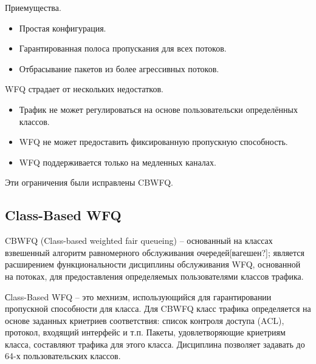 	Приемущества.
	\begin{itemize}
		\item Простая конфигурация.
		\item Гарантированная полоса пропускания для всех потоков.
		\item Отбрасывание пакетов из более агрессивных потоков.
	\end{itemize}

    WFQ страдает от нескольких недостатков.
	\begin{itemize}
    	\item  Трафик не может регулироваться на основе пользовательски определённых классов.
    	\item  WFQ не может предоставить фиксированную пропускную способность.
    	\item  WFQ поддерживается только на медленных каналах.
	\end{itemize}

    Эти ограничения были исправлены CBWFQ.

	\subsection{Class-Based WFQ}


    CBWFQ (Class-based weighted fair queueing) -- основанный на классах взвешенный алгоритм равномерного обслуживания 
    очередей[вагешен?]; является расширением функциональности дисциплины обслуживания WFQ,
	основанной на потоках, для предоставления определяемых пользователями классов трафика. 

	Сlass-Based WFQ -- это мехнизм, использующийся для гарантировании пропускной способности
	для класса. Для CBWFQ класс трафика определяется на основе заданных криетриев
	соответствия: список контроля доступа (ACL), протокол, входящий интерфейс и т.п. Пакеты,
	удовлетворяющие криетриям класса, составляют трафика для этого класса. Дисциплина
	позволяет задавать до 64-х пользовательских классов.

